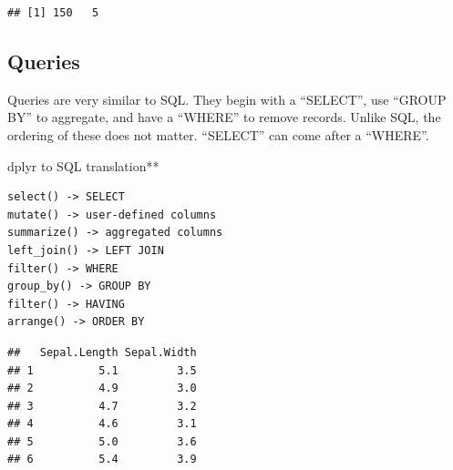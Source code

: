 \documentclass[]{book}
\newenvironment{Shaded}{\begin{snugshade}}{\end{snugshade}}
\newcommand{\DataTypeTok}[1]{\textcolor[rgb]{0.13,0.29,0.53}{#1}}
\newcommand{\KeywordTok}[1]{\textcolor[rgb]{0.13,0.29,0.53}{\textbf{#1}}}
\newcommand{\NormalTok}[1]{#1}
\newcommand{\OperatorTok}[1]{\textcolor[rgb]{0.81,0.36,0.00}{\textbf{#1}}}
\newcommand{\StringTok}[1]{\textcolor[rgb]{0.31,0.60,0.02}{#1}}
\begin{document}
\begin{Shaded}
\end{Shaded}

\begin{verbatim}
## [1] 150   5
\end{verbatim}

\hypertarget{queries}{%
\subsection{Queries}\label{queries}}

Queries are very similar to SQL. They begin with a ``SELECT'', use ``GROUP BY'' to aggregate, and have a ``WHERE'' to remove records. Unlike SQL, the ordering of these does not matter. ``SELECT'' can come after a ``WHERE''.

dplyr to SQL translation**

\begin{verbatim}
select() -> SELECT
mutate() -> user-defined columns
summarize() -> aggregated columns
left_join() -> LEFT JOIN
filter() -> WHERE
group_by() -> GROUP BY
filter() -> HAVING
arrange() -> ORDER BY
\end{verbatim}

\begin{Shaded}
\end{Shaded}

\begin{verbatim}
##   Sepal.Length Sepal.Width
## 1          5.1         3.5
## 2          4.9         3.0
## 3          4.7         3.2
## 4          4.6         3.1
## 5          5.0         3.6
## 6          5.4         3.9
\end{verbatim}

\begin{Shaded}
\end{Shaded}
\end{document}
